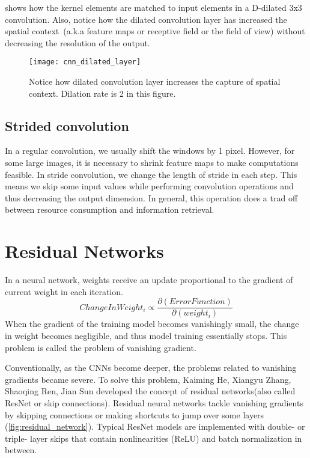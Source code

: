      shows how the kernel elements are matched to input elements in a D-dilated 3x3 convolution. Also, notice how the dilated convolution layer has increased the spatial context~(a.k.a feature maps or receptive field or the field of view) without decreasing the resolution of the output.
    \begin{figure}[h!]
        \centering
        \texttt{[image: cnn\_dilated\_layer]}
        \caption[Dilated convolution layer]{Notice how dilated convolution layer increases the capture of spatial context. Dilation rate is 2 in this figure.}
        \label{fig:dilated_layer}
    \end{figure}


\subsection{Strided convolution}
    In a regular convolution, we usually shift the windows by 1 pixel. However, for some large images, it is necessary to shrink feature maps to make computations feasible. In stride convolution, we change the length of stride in each step. This means we skip some input values while performing convolution operations and thus decreasing the output dimension. In general, this operation does a trad off between resource consumption and information retrieval.


\section[Residual Networks]{Residual Networks}

In a neural network, weights receive an update proportional to the gradient of current weight in each iteration. \begin{equation} ChangeInWeight_{i} \propto \frac{\partial(ErrorFunction)}{\partial(weight_{i})} \end{equation} When the gradient of the training model becomes vanishingly small, the change in weight becomes negligible, and thus model training essentially stops. This problem is called the problem of vanishing gradient.

Conventionally, as the CNNs become deeper, the problems related to vanishing gradients became severe. To solve this problem, {Kaiming He, Xiangyu Zhang, Shaoqing Ren, Jian Sun}\cite{ResNet} developed the concept of residual networks(also called ResNet or skip connections). Residual neural networks tackle vanishing gradients by skipping connections or making shortcuts to jump over some layers (\cref{fig:residual_network}). Typical ResNet models are implemented with double- or triple- layer skips that contain nonlinearities (ReLU) and batch normalization in between.

